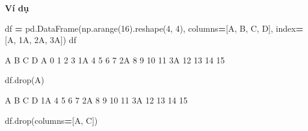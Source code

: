 \documentclass[
]{book}
\newenvironment{Shaded}{\begin{snugshade}}{\end{snugshade}}
\newcommand{\DecValTok}[1]{\textcolor[rgb]{0.00,0.00,0.81}{#1}}
\newcommand{\NormalTok}[1]{#1}
\newcommand{\OperatorTok}[1]{\textcolor[rgb]{0.81,0.36,0.00}{\textbf{#1}}}
\newcommand{\StringTok}[1]{\textcolor[rgb]{0.31,0.60,0.02}{#1}}
\begin{document}
\textbf{Ví dụ}

\begin{Shaded}
\begin{Highlighting}[]
\NormalTok{df }\OperatorTok{=}\NormalTok{ pd.DataFrame(np.arange(}\DecValTok{16}\NormalTok{).reshape(}\DecValTok{4}\NormalTok{, }\DecValTok{4}\NormalTok{),}
\NormalTok{                  columns}\OperatorTok{=}\NormalTok{[}\StringTok{\textquotesingle{}A\textquotesingle{}}\NormalTok{, }\StringTok{\textquotesingle{}B\textquotesingle{}}\NormalTok{, }\StringTok{\textquotesingle{}C\textquotesingle{}}\NormalTok{, }\StringTok{\textquotesingle{}D\textquotesingle{}}\NormalTok{],}
\NormalTok{                  index}\OperatorTok{=}\NormalTok{[}\StringTok{\textquotesingle{}A\textquotesingle{}}\NormalTok{, }\StringTok{\textquotesingle{}1A\textquotesingle{}}\NormalTok{, }\StringTok{\textquotesingle{}2A\textquotesingle{}}\NormalTok{, }\StringTok{\textquotesingle{}3A\textquotesingle{}}\NormalTok{])}
\NormalTok{df}
\end{Highlighting}
\end{Shaded}

\begin{Shaded}
\begin{Highlighting}[]
\NormalTok{     A   B   C   D}
\NormalTok{A    0   1   2   3}
\NormalTok{1A   4   5   6   7}
\NormalTok{2A   8   9  10  11}
\NormalTok{3A  12  13  14  15}
\end{Highlighting}
\end{Shaded}

\begin{Shaded}
\begin{Highlighting}[]
\NormalTok{df.drop(}\StringTok{\textquotesingle{}A\textquotesingle{}}\NormalTok{)}
\end{Highlighting}
\end{Shaded}

\begin{Shaded}
\begin{Highlighting}[]
\NormalTok{    A   B   C   D}
\NormalTok{1A  4   5   6   7}
\NormalTok{2A  8   9   10  11}
\NormalTok{3A  12  13  14  15}
\end{Highlighting}
\end{Shaded}

\begin{Shaded}
\begin{Highlighting}[]
\NormalTok{df.drop(columns}\OperatorTok{=}\NormalTok{[}\StringTok{\textquotesingle{}A\textquotesingle{}}\NormalTok{, }\StringTok{\textquotesingle{}C\textquotesingle{}}\NormalTok{])}
\end{Highlighting}
\end{Shaded}
\end{document}
